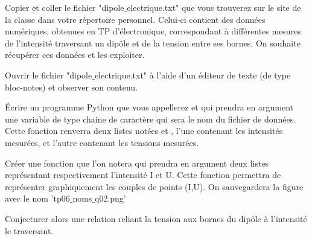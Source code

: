 Copier et coller le fichier "dipole$\_$electrique.txt" que vous trouverez sur le site de la classe dans votre répertoire personnel. Celui-ci contient des données numériques, obtenues en TP d’électronique, correspondant à différentes mesures de l'intensité traversant un dipôle et de la tension entre ses bornes. On souhaite récupérer ces données et les exploiter.

Ouvrir le fichier "dipole$\_$electrique.txt" à l'aide d'un éditeur de texte (de type bloc-notes) et observer son contenu.

\question{}Écrire un programme Python que vous appellerez  et qui prendra en argument une variable de type chaine de caractère qui sera le nom du fichier de données. Cette fonction renverra deux listes notées  et ,  l'une contenant les intensités mesurées, et l'autre contenant les
tensions mesurées.

\question{}Créer une fonction que l'on notera   qui prendra en argument deux listes représentant respectivement l'intensité I et U. Cette fonction permettra de représenter graphiquement les couples de points (I,U). On sauvegardera la figure avec le nom 'tp06$\_$noms$\_$q02.png'



\question{}Conjecturer alors une relation reliant la tension aux bornes du dipôle à l'intensité le traversant.